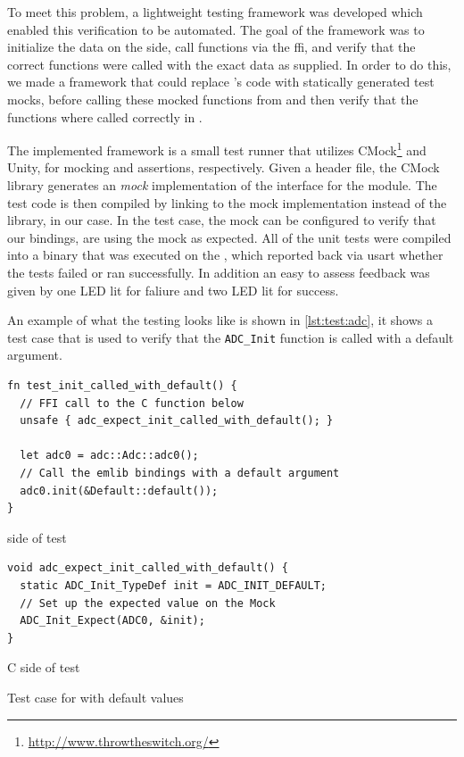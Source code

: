 To meet this problem, a lightweight testing framework was developed which enabled this verification to be automated.
The goal of the framework was to initialize the data on the {\rust} side, call functions via the \gls{ffi}, and verify that the correct functions were called with the exact data as supplied.
In order to do this, we made a framework that could replace {\emlib}'s code with statically generated test mocks, before calling these mocked functions from {\rust} and then verify that the functions where called correctly in {\C}.

The implemented framework is a small test runner that utilizes CMock\footnote{\url{http://www.throwtheswitch.org/}\label{foot:throw}} and Unity, for mocking and assertions, respectively.
Given a {\C} header file, the CMock library generates an \emph{mock} implementation of the interface for the module.
The test code is then compiled by linking to the mock implementation instead of the library, {\emlib} in our case.
In the test case, the mock can be configured to verify that our bindings, are using the mock as expected.
All of the unit tests were compiled into a binary that was executed on the {\gecko}, which reported back via \gls{usart} whether the tests failed or ran successfully.
In addition an easy to assess feedback was given by one LED lit for faliure and two LED lit for success.

An example of what the testing looks like is shown in \autoref{lst:test:adc}, it shows a test case that is used to verify that the \texttt{ADC\_Init} function is called with a default argument.

\begin{listing}[H]
  \centering
  \begin{minipage}{\textwidth}
  \begin{listing}
    \begin{verbatim}
fn test_init_called_with_default() {
  // FFI call to the C function below
  unsafe { adc_expect_init_called_with_default(); }

  let adc0 = adc::Adc::adc0();
  // Call the emlib bindings with a default argument
  adc0.init(&Default::default());
}
    \end{verbatim}
    \caption{{\rust} side of  test}
    \label{lst:test:adc:rust}
  \end{listing}
  \end{minipage}

  \begin{minipage}{\textwidth}
  \begin{listing}
    \begin{verbatim}
void adc_expect_init_called_with_default() {
  static ADC_Init_TypeDef init = ADC_INIT_DEFAULT;
  // Set up the expected value on the Mock
  ADC_Init_Expect(ADC0, &init);
}
    \end{verbatim}
    \caption{C side of  test}
    \label{lst:test:adc:c}
  \end{listing}
  \end{minipage}

  \caption{Test case for  with default values}
  \label{lst:test:adc}
\end{listing}

